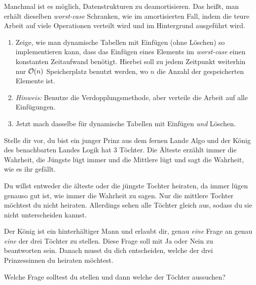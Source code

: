 \documentclass{uebung_cs}
\begin{document}
\begin{aufgabe}
	Manchmal ist es möglich, Datenstrukturen zu deamortisieren. Das heißt, man erhält dieselben \emph{worst-case} Schranken, wie im amortisierten Fall, indem die teure Arbeit auf viele Operationen verteilt wird und im Hintergrund ausgeführt wird.

	\begin{enumerate}
		\item
	Zeige, wie man dynamische Tabellen mit Einfügen (ohne Löschen) so implementieren kann, dass das Einfügen eines Elements im \emph{worst-case} einen konstanten Zeitaufwand benötigt. Hierbei soll zu jedem Zeitpunkt weiterhin nur $\mathcal{O}(n)$ Speicherplatz benutzt werden, wo $n$ die Anzahl der gespeicherten Elemente ist.
	
	\item[]
	\textit{Hinweis:} Benutze die Verdopplungsmethode, aber verteile die Arbeit auf alle Einfügungen.

	\item Jetzt mach dasselbe für dynamische Tabellen mit Einfügen \emph{und} Löschen.
	\end{enumerate}
\end{aufgabe}

\begin{aufgabe}[Puzzle der Woche: Prinzessinnen]
	Stelle dir vor, du bist ein junger Prinz aus dem fernen Lande Algo und der König des benachbarten Landes Logik hat 3 Töchter. Die Älteste erzählt immer die Wahrheit, die Jüngste lügt immer und die Mittlere lügt und sagt die Wahrheit, wie es ihr gefällt.
	
	Du willst entweder die älteste oder die jüngste Tochter heiraten, da immer lügen genauso gut ist, wie immer die Wahrheit zu sagen. Nur die mittlere Tochter möchtest du nicht heiraten. Allerdings sehen alle Töchter gleich aus, sodass du sie nicht unterscheiden kannst.

	Der König ist ein hinterhältiger Mann und erlaubt dir, genau \textit{eine} Frage an genau \textit{eine} der drei Töchter zu stellen. Diese Frage soll mit \glqq Ja\grqq{} oder \glqq Nein\grqq{} zu beantworten sein. Danach musst du dich entscheiden, welche der drei Prinzessinnen du heiraten möchtest. 

	Welche Frage solltest du stellen und dann welche der Töchter aussuchen?
\end{aufgabe}
\end{document}
